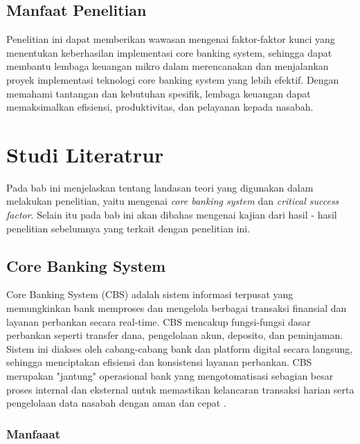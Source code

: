 \documentclass[journal,article,submit,pdftex,moreauthors]{Definitions/mdpi}
\begin{document}
\subsection{Manfaat Penelitian}
Penelitian ini dapat memberikan wawasan mengenai faktor-faktor kunci yang menentukan keberhasilan implementasi core banking system, sehingga dapat membantu lembaga keuangan mikro dalam merencanakan dan menjalankan proyek implementasi teknologi core banking system yang lebih efektif. Dengan memahami tantangan dan kebutuhan spesifik, lembaga keuangan dapat memaksimalkan efisiensi, produktivitas, dan pelayanan kepada nasabah.




\section{Studi Literatrur} \label{sec:Studi Literatrur}

Pada bab ini menjelaskan tentang landasan teori yang digunakan dalam melakukan penelitian, yaitu mengenai \textit{core banking system} dan \textit{critical success factor}. Selain itu pada bab ini akan dibahas mengenai kajian dari hasil - hasil penelitian sebelumnya yang terkait dengan penelitian ini.

\subsection{Core Banking System} \label{sec:Core Banking System}

Core Banking System (CBS) adalah sistem informasi terpusat yang memungkinkan bank memproses dan mengelola berbagai transaksi finansial dan layanan perbankan secara real-time. CBS mencakup fungsi-fungsi dasar perbankan seperti transfer dana, pengelolaan akun, deposito, dan peminjaman. Sistem ini diakses oleh cabang-cabang bank dan platform digital secara langsung, sehingga menciptakan efisiensi dan konsistensi layanan perbankan. CBS merupakan "jantung" operasional bank yang mengotomatisasi sebagian besar proses internal dan eksternal untuk memastikan kelancaran transaksi harian serta pengelolaan data nasabah dengan aman dan cepat \cite{Hsiao-ebanking}.

\subsubsection{Manfaaat}
\end{document}
